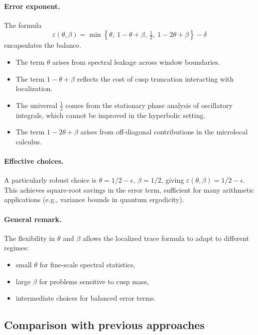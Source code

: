 \paragraph{Error exponent.}
The formula
\[
  \varepsilon(\theta,\beta) =
     \min\!\left\{\theta,\ 1-\theta+\beta,\ \tfrac{1}{2},\ 1-2\theta+\beta\right\} - \delta
\]
encapsulates the balance.  
\begin{itemize}
  \item The term $\theta$ arises from spectral leakage across window boundaries.
  \item The term $1-\theta+\beta$ reflects the cost of cusp truncation interacting with
        localization.
  \item The universal $\tfrac{1}{2}$ comes from the stationary phase analysis of oscillatory
        integrals, which cannot be improved in the hyperbolic setting.
  \item The term $1-2\theta+\beta$ arises from off-diagonal contributions in the microlocal
        calculus.
\end{itemize}

\paragraph{Effective choices.}
A particularly robust choice is $\theta=1/2-\epsilon$, $\beta=1/2$, giving
$\varepsilon(\theta,\beta)=1/2-\epsilon$.  
This achieves square-root savings in the error term, sufficient for many arithmetic
applications (e.g., variance bounds in quantum ergodicity).  

\paragraph{General remark.}
The flexibility in $\theta$ and $\beta$ allows the localized trace formula to adapt to
different regimes:
\begin{itemize}
  \item small $\theta$ for fine-scale spectral statistics,
  \item large $\beta$ for problems sensitive to cusp mass,
  \item intermediate choices for balanced error terms.
\end{itemize}

\subsection{Comparison with previous approaches}\label{subsec:comparison}

